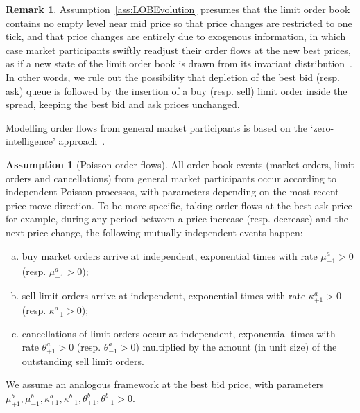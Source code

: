 \documentclass{amsart}[11pt]
\numberwithin{equation}{section}
\theoremstyle{definition}
\newtheorem{remark}[theorem]{Remark}
\newtheorem{assumption}[theorem]{Assumption}
\begin{document}
\begin{remark}
Assumption~\ref{ass:LOBEvolution} presumes that the limit order book contains no empty level near mid price
so that price changes are restricted to one tick,
and that price changes are entirely due to exogenous information,
in which case market participants swiftly readjust their order flows at the new best prices, 
as if a new state of the limit order book is drawn from its invariant distribution~\cite{huang2015simulating}.
In other words, we rule out the possibility that depletion of the best bid (resp. ask) queue is followed by the insertion of a buy (resp. sell) limit order inside the spread,
keeping the best bid and ask prices unchanged.
\end{remark}

Modelling order flows from general market participants is based on the `zero-intelligence' approach~\cite{cont2013price, cont2010stochastic, smith2003statistical}.
\begin{assumption}[Poisson order flows]\label{ass:PoissonOrderFlow}\leavevmode
All order book events (market orders, limit orders and cancellations) from general market participants occur according to independent Poisson processes, 
with parameters depending on the most recent price move direction. 
To be more specific,
taking order flows at the best ask price for example, during any period between a price increase (resp. decrease) and the next price change, the following mutually independent events happen:
\begin{enumerate}[(a)]
\item \label{ass:PoissonOrderFlow1}
buy market orders arrive at independent, exponential times with rate $\mu^a_{+1}>0$ (resp. $\mu^a_{-1}>0$);
\item \label{ass:PoissonOrderFlow2}
sell limit orders arrive at independent, exponential times with rate $\kappa^a_{+1}>0$ (resp. $\kappa^a_{-1}>0$);
\item \label{ass:PoissonOrderFlow3}
cancellations of limit orders occur at independent, exponential times with rate $\theta^a_{+1}>0$ (resp. $\theta^a_{-1}>0$) multiplied by the amount (in unit size) of the outstanding sell limit orders. 
\end{enumerate}
We assume an analogous framework at the best bid price, with parameters
$\mu^b_{+1}, \mu^b_{-1}, \kappa^b_{+1}, \kappa^b_{-1}, \theta^b_{+1}, \theta^b_{-1} >0$.
\end{assumption}
\end{document}
